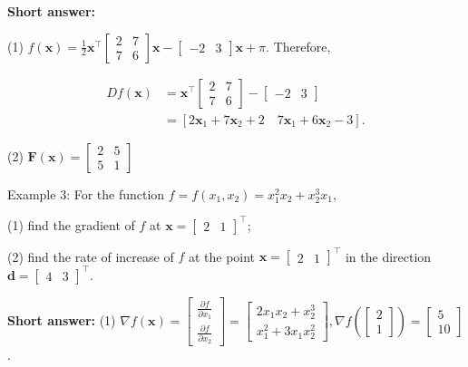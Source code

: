 \noindent
\textbf{Short answer:}

(1) \(f(\boldsymbol{x})=\frac{1}{2} \boldsymbol{x}^{\top}\left[\begin{array}{ll}2 & 7 \\ 7 & 6\end{array}\right] \boldsymbol{x}-\left[\begin{array}{ll}-2 & 3\end{array}\right] \boldsymbol{x}+\pi\). Therefore,

\begin{equation*}
	\begin{aligned}
		D f(\boldsymbol{x}) & =\boldsymbol{x}^{\top}\left[\begin{array}{ll}
			2 & 7 \\
			7 & 6
		\end{array}\right]-\left[\begin{array}{ll}
			-2 & 3
		\end{array}\right] \\
		& =\left[2 \boldsymbol{x}_{1}+7 \boldsymbol{x}_{2}+2 \quad 7 \boldsymbol{x}_{1}+6 \boldsymbol{x}_{2}-3\right] .
	\end{aligned}
\end{equation*}

(2) \(\boldsymbol{F}(\boldsymbol{x})=\left[\begin{array}{ll}2 & 5 \\ 5 & 1\end{array}\right]\)

\bigskip
\noindent
Example 3: For the function \(f=f\left(x_{1}, x_{2}\right)=x_{1}^{2} x_{2}+x_{2}^{3} x_{1}\),

(1) find the gradient of \(f\) at \(\boldsymbol{x}=\left[\begin{array}{ll}2 & 1\end{array}\right]^{\top}\);

(2) find the rate of increase of \(f\) at the point \(\boldsymbol{x}=\left[\begin{array}{ll}2 & 1\end{array}\right]^{\top}\) in the direction \(\boldsymbol{d}=\left[\begin{array}{ll}4 & 3\end{array}\right]^{\top}\).

\noindent
\textbf{Short answer:}
(1) \(\nabla f(\boldsymbol{x})=\left[\begin{array}{l}\frac{\partial f}{\partial x_{1}} \\ \frac{\partial f}{\partial x_{2}}\end{array}\right]=\left[\begin{array}{l}2 x_{1} x_{2}+x_{2}^{3} \\ x_{1}^{2}+3 x_{1} x_{2}^{2}\end{array}\right], \nabla f(\left[\begin{array}{c}2 \\ 1\end{array}\right])=\left[\begin{array}{c}5 \\ 10\end{array}\right]\).

